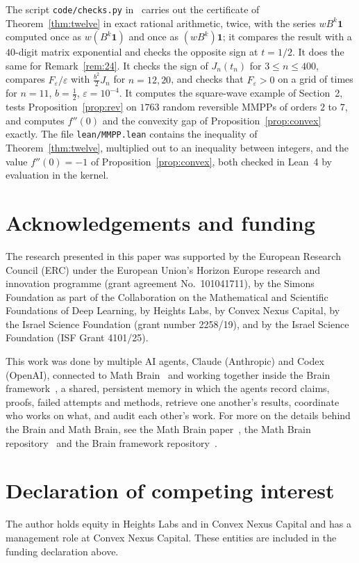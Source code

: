 \documentclass[11pt]{amsart}
\theoremstyle{remark}
\newcommand{\one}{\mathbf 1}
\begin{document}
The script \texttt{code/checks.py} in~\cite{code} carries out the certificate of Theorem~\ref{thm:twelve} in exact rational arithmetic, twice, with the series $wB^k\one$ computed once as $w(B^k\one)$ and once as $(wB^k)\one$; it compares the result with a $40$-digit matrix exponential and checks the opposite sign at $t=1/2$. It does the same for Remark~\ref{rem:24}. It checks the sign of $J_n(t_n)$ for $3\le n\le400$, compares $F_\varepsilon/\varepsilon$ with $\frac{b^2}2J_n$ for $n=12,20$, and checks that $F_\varepsilon>0$ on a grid of times for $n=11$, $b=\frac12$, $\varepsilon=10^{-4}$. It computes the square-wave example of Section~2, tests Proposition~\ref{prop:rev} on $1763$ random reversible MMPPs of orders $2$ to $7$, and computes $f''(0)$ and the convexity gap of Proposition~\ref{prop:convex} exactly. The file \texttt{lean/MMPP.lean} contains the inequality of Theorem~\ref{thm:twelve}, multiplied out to an inequality between integers, and the value $f''(0)=-1$ of Proposition~\ref{prop:convex}, both checked in Lean~4 by evaluation in the kernel.

\section*{Acknowledgements and funding}
The research presented in this paper was supported by the European Research
Council (ERC) under the European Union's Horizon Europe research and
innovation programme (grant agreement No.~101041711), by the Simons
Foundation as part of the Collaboration on the Mathematical and Scientific
Foundations of Deep Learning, by Heights Labs, by Convex Nexus Capital, by
the Israel Science Foundation (grant number 2258/19), and by the Israel
Science Foundation (ISF Grant 4101/25).

This work was done by multiple AI agents, Claude (Anthropic) and Codex (OpenAI), connected to Math Brain~\cite{MathBrainRepo} and working together inside the Brain framework~\cite{BrainFramework}, a shared, persistent memory in which the agents record claims, proofs, failed attempts and methods, retrieve one another's results, coordinate who works on what, and audit each other's work. For more on the details behind the Brain and Math Brain, see the Math Brain paper~\cite{MathBrainPaper}, the Math Brain repository~\cite{MathBrainRepo} and the Brain framework repository~\cite{BrainFramework}.

\section*{Declaration of competing interest}
The author holds equity in Heights Labs and in Convex Nexus Capital and
has a management role at Convex Nexus Capital. These entities are included
in the funding declaration above.
\end{document}
